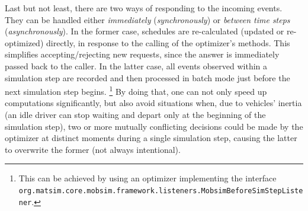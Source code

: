 Last but not least, there are two ways of responding to the incoming events. They can be handled either \emph{immediately} (\emph{synchronously}) or \emph{between time steps} (\emph{asynchronously}). In the former case, schedules are re-calculated (updated or re-optimized) directly, in response to the calling of the optimizer's methods. This simplifies accepting/rejecting new requests, since the answer is immediately passed back to the caller. In the latter case, all events observed within a simulation step are recorded and then processed in batch mode just before the next simulation step begins.%
\footnote{
This can be achieved by using an optimizer implementing the interface \lstinline$org.matsim.core.mobsim.framework.listeners.MobsimBeforeSimStepListener$. 
}
By doing that, one can not only speed up computations significantly, but also avoid situations when, due to vehicles' inertia (\eg an idle driver can stop waiting and depart only at the beginning of the simulation step),
two or more mutually conflicting decisions could be made by the optimizer at distinct moments during a single simulation step, causing the latter to overwrite the former (not always intentional).

